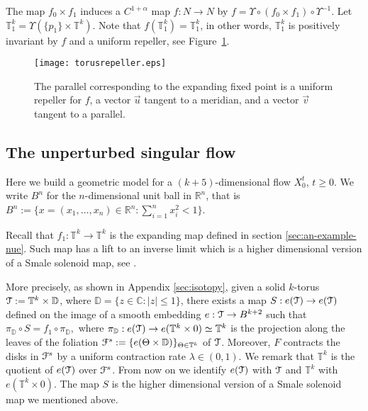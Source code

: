 \documentclass[reqno,12pt,a4paper]{amsart}
\theoremstyle{plain}
\theoremstyle{definition}
\begin{document}
The map $f_0\times
f_1$ induces a $C^{1+\alpha}$ map $f : N\to N$ by
$f=\Upsilon \circ (f_0\times f_1 ) \circ \Upsilon^{-1}.$
Let ${{\mathbb T}}_1^k=\Upsilon(\{p_1\}\times {{\mathbb T}}^k)$.  Note that $f({{\mathbb T}}_1^k)=
{{\mathbb T}}^k_1$, in other words, ${{\mathbb T}}^k_1$ is positively invariant
by $f$ and a uniform repeller, see Figure~\ref{fig:repel}.

\begin{figure}[htpb]
  \centering
  \texttt{[image: torusrepeller.eps]}
  \caption{\label{fig:repel}The parallel corresponding to
    the expanding fixed point is a uniform repeller for $f$,
    a vector $\vec u$ tangent to a meridian, and a vector
    $\vec v$ tangent to a parallel.}
\end{figure}

\subsection{The unperturbed singular flow}
\label{sec:unpert-singul-flow}

Here we build a geometric model for a $(k+5)$-dimensional flow
$X^t_0$, $t \ge 0$.  We write $B^n$ for the $n$-dimensional unit
ball in ${{\mathbb R}}^n$, that is  $B^n:=\{ x=(x_1,\dots,x_n)\in{{\mathbb R}}^n:
\sum_{i=1}^n x_i^2<1\}$.

Recall that $f_1: {{\mathbb T}}^k \to {{\mathbb T}}^k$ is the expanding map defined
in section \ref{sec:an-example-nue}. Such map has a lift to an inverse limit
which is a higher dimensional version of a Smale solenoid map,
see \cite{Sm67}.

More precisely, as shown in Appendix \ref{sec:isotopy},
given a solid $k$-torus ${\EuScript{T}}:={{\mathbb T}}^k\times{{\mathbb D}}$, where
${{\mathbb D}}=\{z\in{{\mathbb C}}:|z|\le1\}$, there exists a map $S: e({\EuScript{T}})\to
e({\EuScript{T}})$ defined on the image of a smooth embedding $e:{\EuScript{T}}\to
B^{k+2}$ such that $\pi_{{\mathbb D}}\circ S = f_1\circ\pi_{{\mathbb D}},$
where $\pi_{{\mathbb D}}:e({\EuScript{T}})\to e({{\mathbb T}}^k\times 0) \simeq{{\mathbb T}}^k$ is
the projection along the leaves of the foliation ${\EuScript{F}}^s:=\{
e(\Theta\times{{\mathbb D}}) \}_{\Theta\in{{\mathbb T}}^k}$ of ${\EuScript{T}}$. Moreover,
$F$ contracts the disks in ${\EuScript{F}}^s$ by a uniform contraction
rate $\lambda\in(0,1)$.  We remark that ${{\mathbb T}}^k$ is the
quotient of $e({\EuScript{T}})$ over ${\EuScript{F}}^s$. From now on we identify
$e({\EuScript{T}})$ with ${\EuScript{T}}$ and ${{\mathbb T}}^k$ with $e({{\mathbb T}}^k\times0)$.  The
map $S$ is the higher dimensional version of a Smale
solenoid map we mentioned above.
\end{document}
